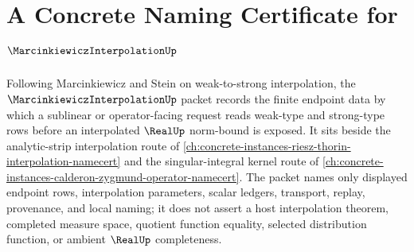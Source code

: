 \chapter{A Concrete Naming Certificate for $\MarcinkiewiczInterpolationUp$}
\label{ch:concrete-instances-marcinkiewicz-interpolation-namecert}

Following Marcinkiewicz and Stein on weak-to-strong interpolation, the $\MarcinkiewiczInterpolationUp$ packet records the finite endpoint data by which a sublinear or operator-facing request reads weak-type and strong-type rows before an interpolated $\RealUp$ norm-bound is exposed. It sits beside the analytic-strip interpolation route of \autoref{ch:concrete-instances-riesz-thorin-interpolation-namecert} and the singular-integral kernel route of \autoref{ch:concrete-instances-calderon-zygmund-operator-namecert}. The packet names only displayed endpoint rows, interpolation parameters, scalar ledgers, transport, replay, provenance, and local naming; it does not assert a host interpolation theorem, completed measure space, quotient function equality, selected distribution function, or ambient $\RealUp$ completeness.

